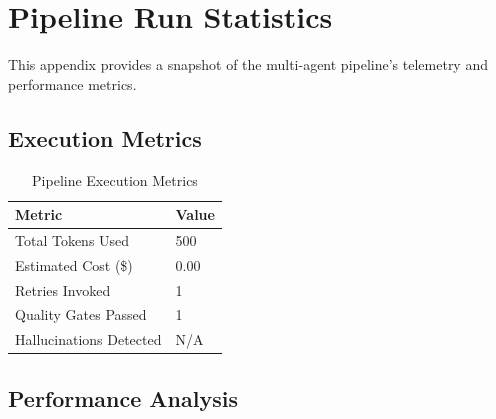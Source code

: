 
\chapter{Pipeline Run Statistics}
This appendix provides a snapshot of the multi-agent pipeline's telemetry and performance metrics.

\section{Execution Metrics}

\begin{table}[h]
\centering
\begin{tabular}{|l|l|}
\hline
\textbf{Metric} & \textbf{Value} \\ \hline
Total Tokens Used & 500 \\ \hline
Estimated Cost (\$) & 0.00 \\ \hline
Retries Invoked & 1 \\ \hline
Quality Gates Passed & 1 \\ \hline
Hallucinations Detected & N/A \\ \hline
\end{tabular}
\caption{Pipeline Execution Metrics}
\end{table}

\section{Performance Analysis}
